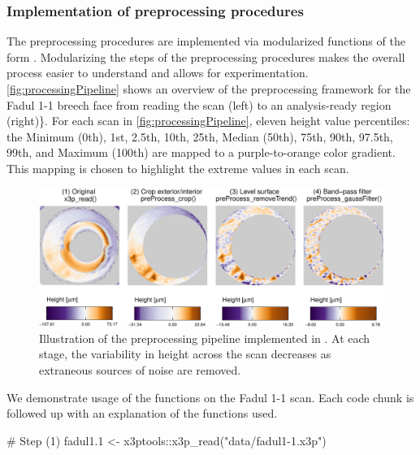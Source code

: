 \hypertarget{implementation-of-preprocessing-procedures}{%
\subsubsection{Implementation of preprocessing
procedures}\label{implementation-of-preprocessing-procedures}}

The preprocessing procedures are implemented via modularized functions
of the form . Modularizing the steps of the
preprocessing procedures makes the overall process easier to understand
and allows for experimentation. \autoref{fig:processingPipeline} shows
an overview of the preprocessing framework for the Fadul 1-1 breech face
from reading the scan (left) to an analysis-ready region (right)\}. For
each scan in \autoref{fig:processingPipeline}, eleven height value
percentiles: the Minimum (0th), 1st, 2.5th, 10th, 25th, Median (50th),
75th, 90th, 97.5th, 99th, and Maximum (100th) are mapped to a
purple-to-orange color gradient. This mapping is chosen to highlight the
extreme values in each scan.

\begin{Schunk}
\begin{figure}[htbp]

{\centering \includegraphics[width=\textwidth]{figures/cmcr-unnamed-chunk-5-1} 

}

\caption{\label{fig:processingPipeline} Illustration of the  preprocessing pipeline implemented in .  At each stage, the variability in height across the scan decreases as extraneous sources of noise are removed.}\label{fig:unnamed-chunk-5}
\end{figure}
\end{Schunk}

We demonstrate usage of the  functions on the Fadul
1-1 scan. Each code chunk is followed up with an explanation of the
functions used.

\begin{Schunk}
\begin{Sinput}
# Step (1)
fadul1.1 <- x3ptools::x3p_read("data/fadul1-1.x3p")
\end{Sinput}
\end{Schunk}

